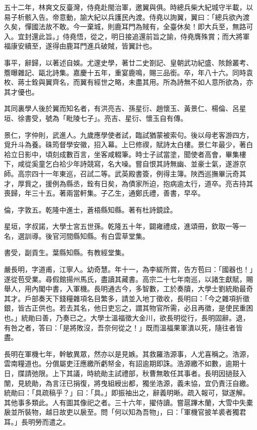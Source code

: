 \begin{pinyinscope}
五十二年，林爽文反臺灣，侍堯赴閩治軍，邀翼與俱。時總兵柴大紀城守半載，以易子析骸入告。帝意動，諭大紀以兵護民內渡。侍堯以詢翼，翼曰：「總兵欲內渡久矣，憚國法故不敢。今一棄城，則鹿耳門為賊有，全臺休矣！即大兵至，無路可入。宜封還此旨。」侍堯悟，從之，明日接追還前旨之諭，侍堯膺殊賞；而大將軍福康安續至，遂得由鹿耳門進兵破賊，皆翼計也。

事平，辭歸，以著述自娛。尤邃史學，著廿二史劄記、皇朝武功紀盛、陔餘叢考、簷曝雜記、甌北詩集。嘉慶十五年，重宴鹿鳴，賜三品銜。卒，年八十六。同時袁枚、蔣士銓與翼齊名，而翼有經世之略，未盡其用。所為詩無不如人意所欲為，亦其才優也。

其同裏學人後於翼而知名者，有洪亮吉、孫星衍、趙懷玉、黃景仁、楊倫、呂星垣、徐書受，號為「毗陵七子」。亮吉、星衍、懷玉自有傳。

景仁，字仲則，武進人。九歲應學使者試，臨試猶蒙被索句。後以母老客游四方，覓升斗為養。硃筠督學安徽，招入幕。上巳修禊，賦詩太白樓。景仁年最少，著白袷立日影中，頃刻成數百言，坐客咸輟筆。時士子試當塗，聞使者高會，畢集樓下，咸從奚童乞白袷少年詩競寫，名大噪。嘗自恨其詩無幽、並豪士氣，遂游京師。高宗四十一年東巡，召試二等。武英殿書簽，例得主簿。陜西巡撫畢沅奇其才，厚貲之，援例為縣丞，銓有日矣，為債家所迫，抱病逾太行，道卒。亮吉持其喪歸，年三十五。著兩當軒集。子乙生，通鄭氏禮，善書，早卒。

倫，字敦五。乾隆中進士，蒼梧縣知縣。著有杜詩鏡詮。

星垣，字叔諾，大學士宮五世孫。乾隆五十年，闢雍禮成，進頌冊，欽取一等一名，選訓導。後官河間縣知縣。有白雲草堂集。

書受，副貢生。葉縣知縣。有教經堂集。

嚴長明，字道甫，江寧人。幼奇慧。年十一，為李紱所賞，告方苞曰：「國器也！」遂從苞受業。尋假館揚州馬氏，盡讀其藏書。高宗二十七年南巡，以諸生獻賦，賜舉人，用內閣中書，入軍機。長明通古今，多智數，工於奏牘，大學士劉統勛最奇其才。戶部奏天下錢糧雜項名目繁多，請並入地丁徵收，長明曰：「今之雜項折徵銀，皆古正供也。若去其名，他日吏忘之，謂其物官所需，必且再徵，是使民重困也。」統勛曰善，乃奏已之。大學士溫福徵大金川，欲長明從行，長明固辭。退，有咎之者，答曰：「是將敗沒，吾奈何從之！」既而溫福果軍潰以死，隨往者皆盡。

長明在軍機七年，幹敏異眾，然亦以是見嫉。其救羅浩源事，人尤喜稱之。浩源，雲南糧道也。分償屬吏汪應繳所虧帑金，有詔逾期即誅。浩源繳不如數，逾期十日，牒請弛限。上下其議，時統勛主試禮部，秋曹無敢任其事者。長明因撾鼓入闈，見統勛，為言汪已捐復，將曳組綬出都，獨坐浩源，義未協，宜仍責汪自繳。統勛曰：「具疏稿乎？」曰：「具。」即振袖出之，辭義明晰。疏入報可，獄遂解。其他事多類此。人有圖其像祀之者。三十六年，擢侍讀。嘗扈蹕木蘭，大雪中失橐扆並所裝物，越日故吏以扆至。問「何以知為吾物」，曰：「軍機官披羊裘者獨君耳。」長明勞而遣之。


\end{pinyinscope}
